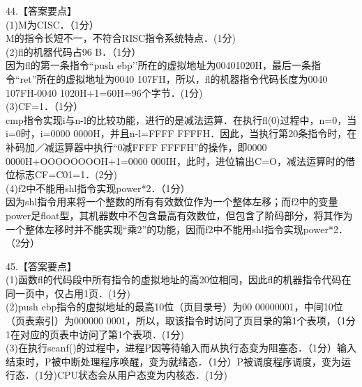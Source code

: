 44.【答案要点】 \\
(1)M为CISC．（1分） \\
M的指令长短不一，不符合RISC指令系统特点．(1分) \\
(2)fl的机器代码占96 B．（1分） \\
因为fl的第一条指令“push ebp'’所在的虚拟地址为00401020H，最后一条指令“ret”所在的虚拟地址为0040 107FH，所以，fl的机器指令代码长度为0040 107FH-0040 1020H+1=60H=96个字节．(1分) \\
(3)CF=1．（1分） \\
cmp指令实现i与n-l的比较功能，进行的是减法运算．在执行fl(0)过程中，n=0，当i=0时，i=0000 0000H，并且n-l=FFFF FFFFH．因此，当执行第20条指令时，在补码加／减运算器中执行“0减FFFF FFFFH”的操作，即0000 0000H+OOOOOOOOH+1=0000 000IH，此时，进位输出C=O，减法运算时的借位标志CF=C01=1．(2分) \\
(4)f2中不能用shl指令实现power*2．（1分） \\
因为shl指令用来将一个整数的所有有效数位作为一个整体左移；而f2中的变量power足float型，其机器数中不包含最高有效数位，但包含了阶码部分，将其作为一个整体左移时并不能实现“乘2”的功能，因而f2中不能用shl指令实现power*2．（2分）

45.【答案要点】 \\
(1)函数fl的代码段中所有指令的虚拟地址的高20位相同，因此fl的机器指令代码在同一页中，仅占用1页．(1分) \\
(2)push ebp指令的虚拟地址的最高10位（页目录号）为00 00000001，中间10位（页表索引）为000000 0001，所以，取该指令时访问了页目录的第1个表项，（1分1在对应的页表中访问了第1个表项．(1分) \\
(3)在执行scanf()的过程中，进程P因等待输入而从执行态变为阻塞态．（1分）输入结束时，P被中断处理程序唤醒，变为就绪态．（1分）P被调度程序调度，变为运行态．(1分)CPU状态会从用户态变为内核态．(1分)


